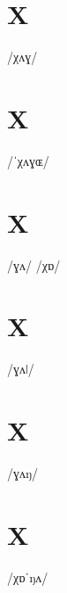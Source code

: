 \documentclass[10pt,a4paper,twoside]{book}
\begin{document}
\section*{X}

\begin{multicols}{3}
 {/χʌɣ/} {}
\end{multicols}

\section*{X}

\begin{multicols}{3}
 {/ˈχʌɣɶ/} {}
\end{multicols}

\section*{X}

\begin{multicols}{3}
 {/ɣʌ/} {}
 {/χɒ/} {}
\end{multicols}

\section*{X}

\begin{multicols}{3}
 {/ɣʌǀ/} {}
\end{multicols}

\section*{X}

\begin{multicols}{3}
 {/ɣʌŋ/} {}
\end{multicols}

\section*{X}

\begin{multicols}{3}
 {/χɒˈŋʌ/} {}
\end{multicols}
\end{document}
